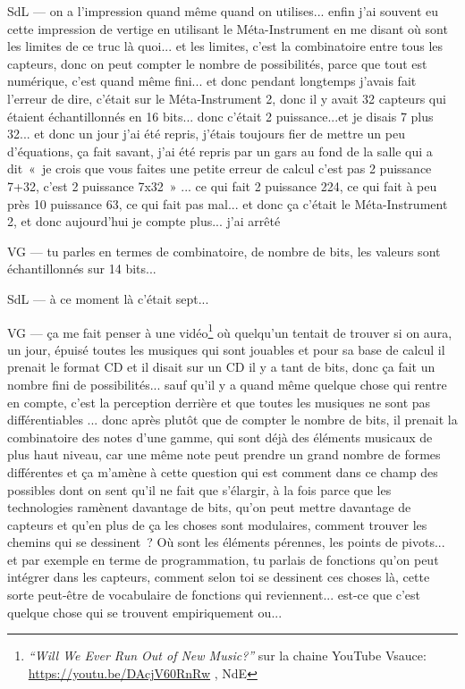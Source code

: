 SdL — on a l'impression quand même quand on utilises... enfin j'ai souvent eu cette impression de vertige en utilisant le Méta-Instrument en me disant où sont les limites de ce truc là quoi... et les limites, c'est la combinatoire entre tous les capteurs, donc on peut compter le nombre de possibilités, parce que tout est numérique, c'est quand même fini... et donc pendant longtemps j'avais fait l'erreur de dire, c'était sur le Méta-Instrument 2, donc il y avait 32 capteurs qui étaient échantillonnés en 16 bits... donc c'était 2 puissance...et je disais 7 plus 32... et donc un jour j'ai été repris, j'étais toujours fier de mettre un peu d'équations, ça fait savant, j'ai été repris par un gars au fond de la salle qui a dit « je crois que vous faites une petite erreur de calcul c'est pas 2 puissance 7+32, c'est 2 puissance 7x32 » ... ce qui fait 2 puissance 224, ce qui fait à peu près 10 puissance 63, ce qui fait pas mal... et donc ça c'était le Méta-Instrument 2, et donc aujourd'hui je compte plus... j'ai arrêté 

VG — tu parles en termes de combinatoire, de nombre de bits, les valeurs sont échantillonnés sur 14 bits... 

SdL — à ce moment là c'était sept... 

VG — ça me fait penser à une vidéo\footnote{\textit{``Will We Ever Run Out of New Music?''} sur la chaine YouTube Vsauce: \url{https://youtu.be/DAcjV60RnRw} , NdE} où quelqu'un tentait de trouver si on aura, un jour, épuisé toutes les musiques qui sont jouables et pour sa base de calcul il prenait le format CD et il disait sur un CD il y a tant de bits, donc ça fait un nombre fini de possibilités... sauf qu'il y a quand même quelque chose qui rentre en compte, c'est la perception derrière et que toutes les musiques ne sont pas différentiables ... donc après plutôt que de compter le nombre de bits, il prenait la combinatoire des notes d'une gamme, qui sont déjà des éléments musicaux de plus haut niveau, car une même note peut prendre un grand nombre de formes différentes et ça m'amène à cette question qui est comment dans ce champ des possibles dont on sent qu'il ne fait que s'élargir, à la fois parce que les technologies ramènent davantage de bits, qu'on peut mettre davantage de capteurs et qu'en plus de ça les choses sont modulaires, comment trouver les chemins qui se dessinent ? Où sont les éléments pérennes, les points de pivots... et par exemple en terme de programmation, tu parlais de fonctions qu'on peut intégrer dans les capteurs, comment selon toi se dessinent ces choses là, cette sorte peut-être de vocabulaire de fonctions qui reviennent... est-ce que c'est quelque chose qui se trouvent empiriquement ou... 

